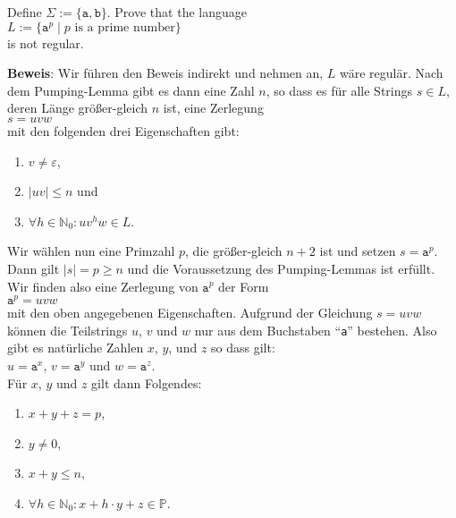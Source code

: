 \renewcommand{\labelenumi}{\arabic{enumi}.}

\exerciseEng
Define $\Sigma := \{\mathtt{a},\mathtt{b}\}$.  
Prove that the language
\\[0.2cm]
\hspace*{1.3cm}
$L := \bigl\{ \mathtt{a}^p \mid \mbox{$p$ is a prime number} \bigr\}$
\\[0.2cm]
is not regular.  \eox
\vspace{0.3cm}

\noindent
\textbf{Beweis}:
Wir f\"uhren den Beweis indirekt und nehmen an, $L$ w\"are regul\"ar.  Nach
dem Pumping-Lemma gibt es dann eine Zahl $n$, so dass es f\"ur alle Strings $s \in L$, 
deren L\"ange gr\"o{\ss}er-gleich $n$ ist, eine Zerlegung
\\[0.2cm]
\hspace*{1.3cm}
$s = uvw$
\\[0.2cm]
mit den folgenden drei Eigenschaften gibt:
\begin{enumerate}
\item $v \not= \varepsilon$, 
\item $|uv| \leq n$ \quad und
\item $\forall h \in \mathbb{N}_0: u v^h w \in L$.
\end{enumerate}
Wir w\"ahlen nun eine Primzahl $p$, die gr\"o{\ss}er-gleich  $n + 2$ ist und setzen $s = \mathtt{a}^p$.
Dann gilt $|s| = p \geq n$ und die Voraussetzung des Pumping-Lemmas ist erf\"ullt.
Wir finden also eine Zerlegung von $\mathtt{a}^p$ der Form
\\[0.2cm]
\hspace*{1.3cm}
$\mathtt{a}^p = uvw$ 
\\[0.2cm]
mit den oben angegebenen Eigenschaften.
Aufgrund der Gleichung $s = uvw$ k\"onnen die Teilstrings $u$, $v$ und $w$ nur aus dem
Buchstaben ``\texttt{a}'' bestehen.  Also gibt es nat\"urliche Zahlen $x$, $y$, und
$z$ so dass gilt:
\\[0.2cm]
\hspace*{1.3cm}
$u = \mathtt{a}^x$, \quad $v = \mathtt{a}^y$ \quad und \quad $w = \mathtt{a}^z$.
\\[0.2cm]
F\"ur  $x$, $y$ und $z$ gilt dann Folgendes:
\begin{enumerate}
\item $x + y + z = p$,
\item $y \not= 0$,
\item $x + y \leq n$,
\item $\forall h \in \mathbb{N}_0: x + h \cdot y + z \in \mathbb{P}$.
\end{enumerate}
